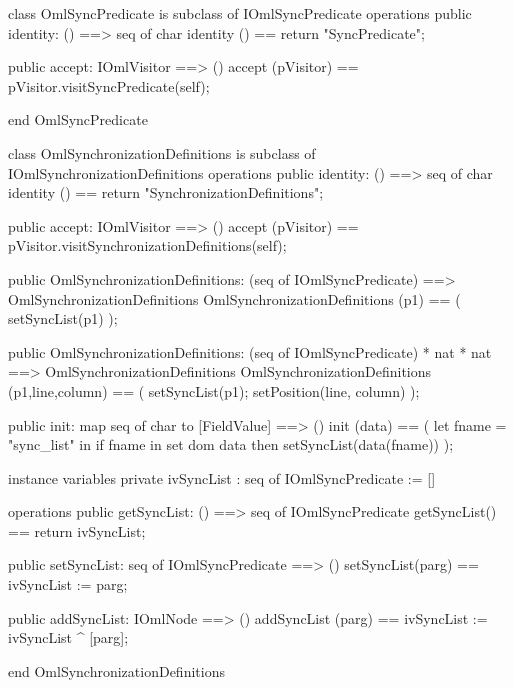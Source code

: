 \begin{vdm_al}
class OmlSyncPredicate is subclass of IOmlSyncPredicate
operations
  public identity: () ==> seq of char
  identity () == return "SyncPredicate";

  public accept: IOmlVisitor ==> ()
  accept (pVisitor) == pVisitor.visitSyncPredicate(self);

end OmlSyncPredicate
\end{vdm_al}
\begin{vdm_al}
class OmlSynchronizationDefinitions is subclass of IOmlSynchronizationDefinitions
operations
  public identity: () ==> seq of char
  identity () == return "SynchronizationDefinitions";

  public accept: IOmlVisitor ==> ()
  accept (pVisitor) == pVisitor.visitSynchronizationDefinitions(self);

  public OmlSynchronizationDefinitions:
    (seq of IOmlSyncPredicate) ==> OmlSynchronizationDefinitions
  OmlSynchronizationDefinitions (p1) == 
    ( setSyncList(p1) );

  public OmlSynchronizationDefinitions:
    (seq of IOmlSyncPredicate) *
    nat *
    nat ==> OmlSynchronizationDefinitions
  OmlSynchronizationDefinitions (p1,line,column) == 
    ( setSyncList(p1);
      setPosition(line, column) );

  public init: map seq of char to [FieldValue] ==> ()
  init (data) ==
    ( let fname = "sync_list" in
        if fname in set dom data
        then setSyncList(data(fname)) );

instance variables
  private ivSyncList : seq of IOmlSyncPredicate := []

operations
  public getSyncList: () ==> seq of IOmlSyncPredicate
  getSyncList() == return ivSyncList;

  public setSyncList: seq of IOmlSyncPredicate ==> ()
  setSyncList(parg) == ivSyncList := parg;

  public addSyncList: IOmlNode ==> ()
  addSyncList (parg) == ivSyncList := ivSyncList ^ [parg];

end OmlSynchronizationDefinitions
\end{vdm_al}

